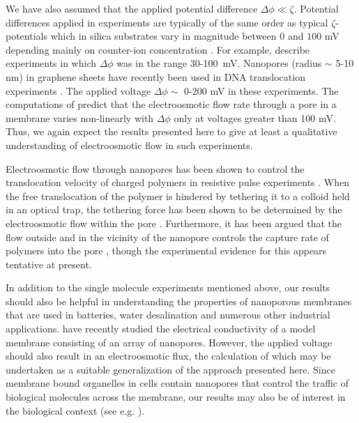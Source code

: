 We have also assumed that the applied potential difference $\Delta\phi\ll\zeta$. Potential differences applied in experiments are typically of the same order as typical $\zeta$-potentials
which in silica substrates vary in magnitude between $0$ and $100$ mV 
depending mainly on counter-ion concentration \cite{kirby2004zeta,kirby2004zeta2}. 
For example, \cite{Keyser2006} describe experiments in which $\Delta\phi$ was in the range 30-100~mV. Nanopores (radius $\sim$ 5-10 nm) in graphene sheets have recently been used in
DNA translocation experiments \cite{Garaj2010,Schneider2010,Merchant2010}.
The applied voltage $\Delta \phi \sim$ 0-200 mV in these experiments. The computations of \cite{Mao2013} predict that the electroosmotic flow rate through a pore in a membrane
varies non-linearly with $\Delta\phi$ only at voltages greater than 100 mV. Thus, we again expect the results presented here to give at least a qualitative understanding of electroosmotic flow in such experiments.

Electroosmotic flow through nanopores has been shown to control the translocation 
velocity of charged polymers in resistive pulse  
experiments \cite{ghosal2006electrophoresis,ghosal2007effect}. When the free translocation of the polymer is hindered by tethering it to a colloid held in an optical trap, the tethering force has been shown to be determined by the electroosmotic flow within the pore \cite{Ghosal2007,Keyser2006,laohakunakorn2013dna}.
Furthermore, it has been argued that the flow outside and in the vicinity of the nanopore 
controls the capture rate of polymers into the pore \cite{wong2007polymer}, though the 
experimental evidence for this appears tentative at present.

In addition to the single molecule experiments mentioned above, our results should also be helpful 
in understanding the properties of nanoporous membranes that are used in batteries, water desalination and numerous other industrial applications. \cite{gadaleta2014sub} have recently studied the electrical conductivity of a model membrane consisting of an array of nanopores. However, the applied voltage should also result in an electroosmotic flux, the calculation of which may be undertaken as a suitable generalization of the approach presented here. 
Since membrane bound organelles in cells contain nanopores that control the traffic of biological molecules across the membrane, our results may also be of interest in the biological 
context (see e.g. \cite{gu2003electroosmotic}).